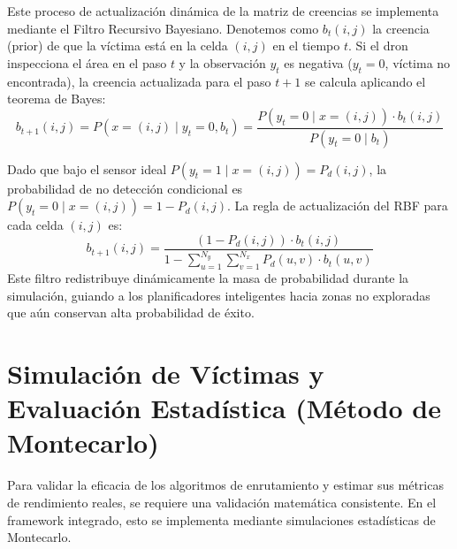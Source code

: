 Este proceso de actualización dinámica de la matriz de creencias se implementa mediante el Filtro Recursivo Bayesiano. Denotemos como $b_t(i, j)$ la creencia (prior) de que la víctima está en la celda $(i, j)$ en el tiempo $t$. Si el dron inspecciona el área en el paso $t$ y la observación $y_t$ es negativa ($y_t = 0$, víctima no encontrada), la creencia actualizada para el paso $t+1$ se calcula aplicando el teorema de Bayes:
\begin{equation}
    b_{t+1}(i, j) = P\left(x = (i,j) \mid y_t = 0, b_t\right) = \frac{P\left(y_t = 0 \mid x = (i,j)\right) \cdot b_t(i, j)}{P\left(y_t = 0 \mid b_t\right)}
\end{equation}

Dado que bajo el sensor ideal $P\left(y_t = 1 \mid x = (i,j)\right) = P_d(i, j)$, la probabilidad de no detección condicional es $P\left(y_t = 0 \mid x = (i,j)\right) = 1 - P_d(i, j)$. La regla de actualización del RBF para cada celda $(i, j)$ es:
\begin{equation}
    b_{t+1}(i, j) = \frac{\left(1 - P_d(i, j)\right) \cdot b_t(i, j)}{1 - \sum_{u=1}^{N_y} \sum_{v=1}^{N_x} P_d(u, v) \cdot b_t(u, v)}
\end{equation}
Este filtro redistribuye dinámicamente la masa de probabilidad durante la simulación, guiando a los planificadores inteligentes hacia zonas no exploradas que aún conservan alta probabilidad de éxito.

\section{Simulación de Víctimas y Evaluación Estadística (Método de Montecarlo)}

Para validar la eficacia de los algoritmos de enrutamiento y estimar sus métricas de rendimiento reales, se requiere una validación matemática consistente. En el framework integrado, esto se implementa mediante simulaciones estadísticas de Montecarlo.

